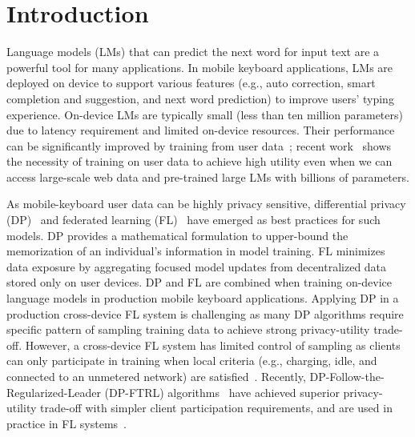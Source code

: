 \section{Introduction}
Language models (LMs) that can predict the next word for input text are a powerful tool for many applications. In mobile keyboard applications, LMs are deployed on device to support various features (e.g., auto correction, smart completion and suggestion, and next word prediction) to improve users’ typing experience. On-device LMs are typically small (less than ten million parameters) due to latency requirement and limited on-device resources. Their performance can be significantly improved by training from user data~\citep{hard2018gboard,xu2023federated}; recent work~\citep{wang2023can,wu2024prompt} shows the necessity of training on user data to achieve high utility even when we can access large-scale web data and pre-trained large LMs with billions of parameters. 

As mobile-keyboard user data can be highly privacy sensitive, differential privacy (DP)~\citep{dwork2006calibrating,dwork2014algorithmic} and federated learning (FL)~\citep{mcmahan2017fedavg,kairouz2019advances} have emerged as best practices for such models. 
DP provides a mathematical formulation to upper-bound the memorization of an individual’s information in model training. FL minimizes data exposure by aggregating focused model updates from decentralized data stored only on user devices. DP and FL are combined when training on-device language models in production mobile keyboard applications. Applying DP in a production cross-device FL system is challenging as many DP algorithms require specific pattern of sampling training data to achieve strong privacy-utility trade-off. However, a cross-device FL system has limited control of sampling as clients can only participate in training when local criteria (e.g., charging, idle, and connected to an unmetered network) are satisfied~\citep{bonawitz2019towards,huba2022papaya}. 
Recently, DP-Follow-the-Regularized-Leader (DP-FTRL) algorithms~\citep{kairouz21practical,choquette2023amplified} have achieved superior privacy-utility trade-off with simpler client participation requirements, and are used in practice in FL systems~\citep{xu2023federated,zhang2023private}. 

